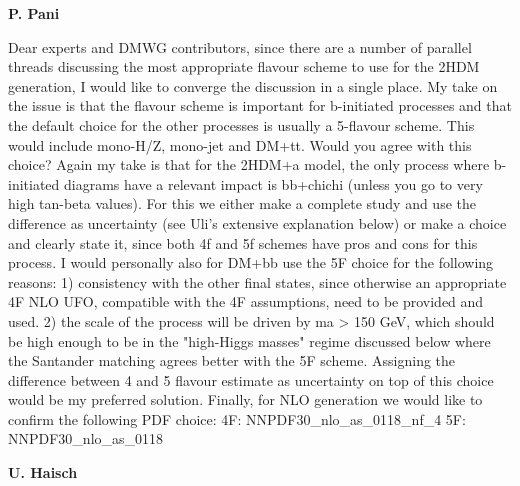 \tiny

\textbf{P. Pani}

Dear experts and DMWG contributors, since there are a number of parallel
threads discussing the most appropriate flavour scheme to use for the
2HDM generation, I would like to converge the discussion in a single
place. My take on the issue is that the flavour scheme is important for
b-initiated processes and that the default choice for the other
processes is usually a 5-flavour scheme. This would include mono-H/Z,
mono-jet and DM+tt. Would you agree with this choice? Again my take is
that for the 2HDM+a model, the only process where b-initiated diagrams
have a relevant impact is bb+chichi (unless you go to very high tan-beta
values). For this we either make a complete study and use the difference
as uncertainty (see Uli's extensive explanation below) or make a choice
and clearly state it, since both 4f and 5f schemes have pros and cons
for this process. I would personally also for DM+bb use the 5F choice
for the following reasons: 1) consistency with the other final states,
since otherwise an appropriate 4F NLO UFO, compatible with the 4F
assumptions, need to be provided and used. 2) the scale of the process
will be driven by ma \textgreater{} 150 GeV, which should be high enough
to be in the "high-Higgs masses" regime discussed below where the
Santander matching agrees better with the 5F scheme. Assigning the
difference between 4 and 5 flavour estimate as uncertainty on top of
this choice would be my preferred solution. Finally, for NLO generation
we would like to confirm the following PDF choice: 4F:
NNPDF30\_nlo\_as\_0118\_nf\_4 5F: NNPDF30\_nlo\_as\_0118 

\textbf{U. Haisch}

